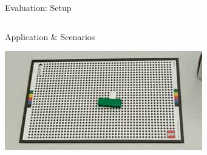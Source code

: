 \documentclass[aspectratio=1610]{beamer}
\begin{document}
\begin{frame}{Evaluation: Setup}
    \begin{columns}[onlytextwidth]
        \begin{column}{.5\linewidth}
            \begin{block}{Application \& Scenarios}
                \begin{center}
                    \includegraphics[width=.7\linewidth]{img/lego/img3.jpeg}


\end{center}
\end{block}
\end{column}
\end{columns}
\end{frame}
\end{document}
